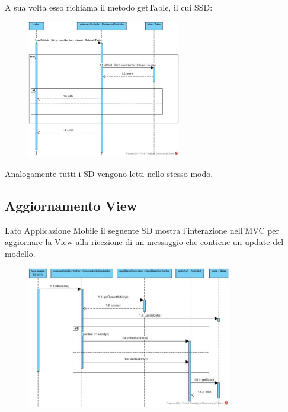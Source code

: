 A sua volta esso richiama il metodo getTable, il cui SSD:
 \begin{figure}[H]
	\centering
	\includegraphics[width=0.6\textwidth]{Immagini/tablesAndOrdersArea_getTable.jpg}
\end{figure}

\vspace{1cm}
Analogamente tutti i SD vengono letti nello stesso modo.

\subsection{Aggiornamento View}
Lato Applicazione Mobile il seguente SD mostra l'interazione nell'MVC per aggiornare la View alla ricezione di un messaggio che contiene un update del modello.
\begin{figure}[H]
	\centering
	\includegraphics[width=0.8\textwidth]{Immagini/aggiornamento_view.jpg}
\end{figure}

